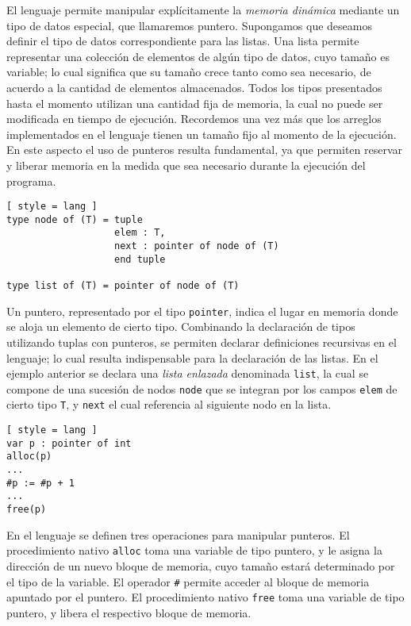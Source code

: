 El lenguaje permite manipular explícitamente la \textit{memoria dinámica} mediante un tipo de datos especial, que llamaremos puntero.
Supongamos que deseamos definir el tipo de datos correspondiente para las listas.
Una lista permite representar una colección de elementos de algún tipo de datos, cuyo tamaño es variable; lo cual significa que su tamaño crece tanto como sea necesario, de acuerdo a la cantidad de elementos almacenados.
Todos los tipos presentados hasta el momento utilizan una cantidad fija de memoria, la cual no puede ser modificada en tiempo de ejecución.
Recordemos una vez más que los arreglos implementados en el lenguaje tienen un tamaño fijo al momento de la ejecución.
En este aspecto el uso de punteros resulta fundamental, ya que permiten reservar y liberar memoria en la medida que sea necesario durante la ejecución del programa.

\begin{lstlisting}[ style = lang ]
type node of (T) = tuple
                   elem : T,
                   next : pointer of node of (T)
                   end tuple
                   
type list of (T) = pointer of node of (T)
\end{lstlisting}

Un puntero, representado por el tipo \lstinline[style = lang]{pointer}, indica el lugar en memoria donde se aloja un elemento de cierto tipo.
Combinando la declaración de tipos utilizando tuplas con punteros, se permiten declarar definiciones recursivas en el lenguaje; lo cual resulta indispensable para la declaración de las listas.
En el ejemplo anterior se declara una \textit{lista enlazada} denominada \lstinline[style = lang]{list}, la cual se compone de una sucesión de nodos \lstinline[style = lang]{node} que se integran por los campos \lstinline[style = lang]{elem} de cierto tipo \lstinline[style = lang]{T}, y \lstinline[style = lang]{next} el cual referencia al siguiente nodo en la lista.

\begin{lstlisting}[ style = lang ]
var p : pointer of int
alloc(p)
...
#p := #p + 1
...
free(p)
\end{lstlisting}

En el lenguaje se definen tres operaciones para manipular punteros.
El procedimiento nativo \lstinline[style = lang]{alloc} toma una variable de tipo puntero, y le asigna la dirección de un nuevo bloque de memoria, cuyo tamaño estará determinado por el tipo de la variable.
El operador \lstinline[style = lang]{#} permite acceder al bloque de memoria apuntado por el puntero.
El procedimiento nativo \lstinline[style = lang]{free} toma una variable de tipo puntero, y libera el respectivo bloque de memoria.

